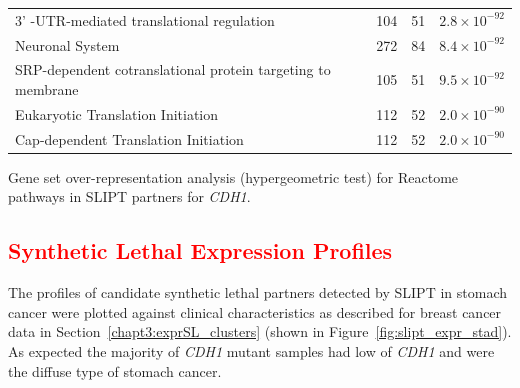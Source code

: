 \begin{table}[!htbp]
{\begin{threeparttable}
\begin{tabular}{lccc}
  3' -UTR-mediated translational regulation & 104 &  51 & $2.8 \times 10^{-92}$ \\ 
  \rowcolor{black!10}
  Neuronal System & 272 &  84 & $8.4 \times 10^{-92}$ \\ 
  \rowcolor{black!5}
  SRP-dependent cotranslational protein targeting to membrane & 105 &  51 & $9.5 \times 10^{-92}$ \\ 
  \rowcolor{black!10}
  Eukaryotic Translation Initiation & 112 &  52 & $2.0 \times 10^{-90}$ \\ 
  \rowcolor{black!5}
  Cap-dependent Translation Initiation & 112 &  52 & $2.0 \times 10^{-90}$ \\ 
   \hline
\end{tabular}
\begin{tablenotes}
\raggedright %
Gene set over-representation analysis (hypergeometric test) for Reactome pathways in \gls{SLIPT} partners for \textit{CDH1}.
\end{tablenotes}
\end{threeparttable}
}
\end{table}




\subsection{\textcolor{red}{Synthetic Lethal Expression Profiles}} \label{chapt3:stad_SL_clusters}

The  profiles of candidate \gls{synthetic lethal} partners detected by \gls{SLIPT} in stomach cancer were plotted against clinical characteristics as described for breast cancer data in Section~\ref{chapt3:exprSL_clusters} (shown in Figure~\ref{fig:slipt_expr_stad}). As expected the majority of \textit{CDH1} \gls{mutant} samples had low  of \textit{CDH1} and were the diffuse type of stomach cancer.

